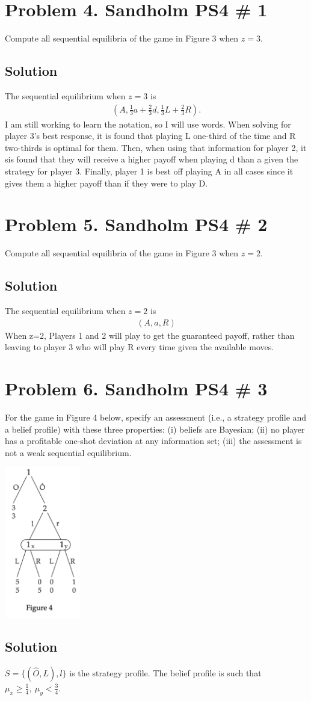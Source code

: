 \documentclass[10pt, a4paper]{article}
\begin{document}
\section*{Problem 4. Sandholm PS4 \# 1}
  Compute all sequential equilibria of the game in Figure 3 when $z=3$.
  \subsection*{Solution}
    The sequential equilibrium when $z=3$ is 
    \begin{gather*}
      (A, \frac{1}{3}a + \frac{2}{3}d, \frac{1}{3}L + \frac{2}{3}R).
    \end{gather*}
    I am still working to learn the notation, so I will use words. When solving for player 3's best response, it is found that playing L one-third of the time and R two-thirds is optimal for them. Then, when using that information for player 2, it sis found that they will receive a higher payoff when playing d than a given the strategy for player 3. Finally, player 1 is best off playing A in all cases since it gives them a higher payoff than if they were to play D.  
\section*{Problem 5. Sandholm PS4 \# 2}
  Compute all sequential equilibria of the game in Figure 3 when $z=2$.
  \subsection*{Solution}
    The sequential equilibrium when $z=2$ is 
    \begin{gather*}
      (A,a,R)
    \end{gather*}
    When z=2, Players 1 and 2 will play to get the guaranteed payoff, rather than leaving to player 3 who will play R every time given the available moves.
\section*{Problem 6. Sandholm PS4 \# 3}
  For the game in Figure 4 below, specify an assessment (i.e., a strategy profile and a belief profile) with these three properties: (i) beliefs are Bayesian; (ii) no player has a profitable one-shot deviation at any information set; (iii) the assessment is not a weak sequential equilibrium.
  \begin{center}
    \includegraphics[width = 0.25\textwidth]{fig4.png}
  \end{center}
  \subsection*{Solution}
    $S = \{(\hat{O}, L), l\}$ is the strategy profile. The belief profile is such that $\mu_x \geq \frac{1}{4}, \ \mu_y < \frac{3}{4}$. 
\end{document}
